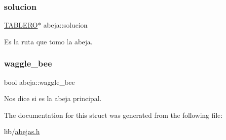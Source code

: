 \subsubsection{\texorpdfstring{solucion}{solucion}}
{\footnotesize\ttfamily \hyperlink{tablero_8h_acbb1e9c862ccf810af77512ddb019a82}{T\+A\+B\+L\+E\+RO}$\ast$ abeja\+::solucion}

Es la ruta que tomo la abeja. \mbox{\label{structabeja_a5811ab09f25d7a2c258573d6ed2104ca}} 
\subsubsection{\texorpdfstring{waggle\+\_\+bee}{waggle\_bee}}
{\footnotesize\ttfamily bool abeja\+::waggle\+\_\+bee}

Nos dice si es la abeja principal. 

The documentation for this struct was generated from the following file\+:\begin{DoxyCompactItemize}
\item 
lib/\hyperlink{abejas_8h}{abejas.\+h}\end{DoxyCompactItemize}
